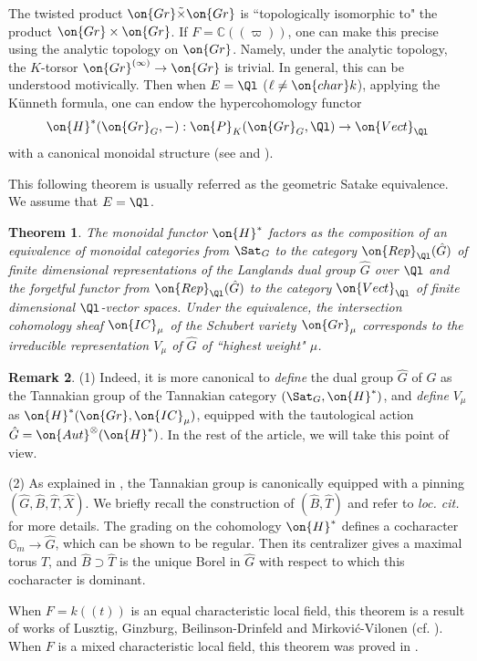 \documentclass[11pt]{amsart}
\newtheorem{thm}{Theorem}[subsection]
\theoremstyle{definition}
\theoremstyle{definition}
\newtheorem{rmk}[thm]{Remark}
\theoremstyle{definition}
\numberwithin{equation}{subsection}
\newcommand{\bC}{{\mathbb C}}
\newcommand{\bG}{{\mathbb G}}
\newcommand{\Aut}{{\on{Aut}}}
\newcommand{\cha}{{\on{char}}}
\newcommand{\Gr}{{\on{Gr}}}
\newcommand{\IC}{\on{IC}}
\begin{document}
The twisted product $\Gr\tilde\times\Gr$ is ``topologically isomorphic to" the product $\Gr\times\Gr$. If $F=\bC((\varpi))$, one can make this precise using the analytic topology on $\Gr$. Namely, under the analytic topology, the $K$-torsor $\Gr^{(\infty)}\to \Gr$ is trivial.  In general, this can be understood motivically. 
Then when $E=\Ql$ ($\ell\neq \cha k$), applying the K\"unneth formula, one can endow the hypercohomology functor 
$$\on{H}^*(\Gr_G,-) : \on{P}_{K}(\Gr_G,\Ql)\to \on{Vect}_{\Ql}$$ with a canonical monoidal structure (see \cite[\S 2.3]{Zh1} and \cite[\S 5.2]{Zh2}). 

This following theorem is usually referred as the geometric Satake equivalence. We assume that $E=\Ql$.

\begin{thm}\label{intro:geomSat}
The monoidal functor $\on{H}^*$ factors as the composition of an equivalence of monoidal categories from $\Sat_G$ to the category $\on{Rep}_{\Ql}(\hat{G})$ of finite dimensional representations of the Langlands dual group $\hat{G}$ over  $\Ql$ and the forgetful functor from $\on{Rep}_{\Ql}(\hat{G})$ to the category $\on{Vect}_{\Ql}$ of finite dimensional $\Ql$-vector spaces. Under the equivalence, the intersection cohomology sheaf $\IC_\mu$ of the Schubert variety $\Gr_\mu$ corresponds to the irreducible representation $V_\mu$ of $\hat G$ of ``highest weight" $\mu$.
\end{thm}


\begin{rmk}
\label{R: birth of the dual group}
(1) Indeed, it is more canonical to \emph{define} the dual group $\hat G$ of $G$ as the Tannakian group of the Tannakian category $(\Sat_G,\on{H}^*)$, and \emph{define} $V_\mu$ as $\on{H}^*(\Gr,\IC_\mu)$, equipped with the tautological action $\hat G=\Aut^\otimes(\on{H}^*)$. In the rest of the article, we will take this point of view.

(2) As explained in \cite[\S 5.3]{Zh2}, the Tannakian group is canonically equipped with a pinning $(\hat G, \hat B, \hat T, \hat X)$. We briefly recall the construction of $(\hat B, \hat T)$ and refer to \emph{loc. cit.} for more details.
The grading on the cohomology $\on{H}^*$ defines a cocharacter $\bG_m\to \hat G$, which can be shown to be regular. Then its centralizer gives a maximal torus $\hat T$, and $\hat B\supset \hat T$ is the unique Borel in $\hat G$ with respect to which this cocharacter is dominant.
\end{rmk}

When $F=k((t))$ is an equal characteristic local field, this theorem is a result of works of Lusztig, Ginzburg, Beilinson-Drinfeld and Mirkovi\'{c}-Vilonen (cf. \cite{Lu,Gi1,BD,MV}). When $F$ is a mixed characteristic local field, this theorem was proved in \cite{Zh1}. 
\end{document}
